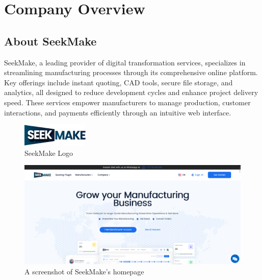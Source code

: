 \chapter{Company Overview}

\section{About SeekMake}
SeekMake, a leading provider of digital transformation services, specializes in streamlining manufacturing processes through its comprehensive online platform. Key offerings include instant quoting, CAD tools, secure file storage, and analytics, all designed to reduce development cycles and enhance project delivery speed. These services empower manufacturers to manage production, customer interactions, and payments efficiently through an intuitive web interface. \cite{seekmakefeatures}
\begin{figure}[H]
    \centering
    \includegraphics{project/images/seekmake.png}
    \caption{SeekMake Logo}
    \label{fig:seekmake-logo}
\end{figure}

\begin{figure}[H]
    \centering
    \includegraphics[width=\textwidth]{project/images/seekmake-homepage.png}
    \caption{A screenshot of SeekMake's homepage}
    \label{fig:seekmake-homepage}
\end{figure}